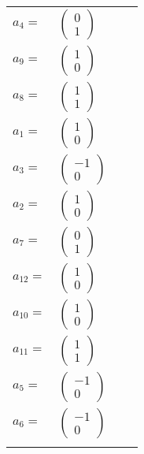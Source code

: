 \documentclass[1p]{elsarticle_modified}
\theoremstyle{definition}
\begin{document}
\begin{tabular}{m{7pt} m{180pt} m{7pt} m{180pt} }
\flushright $a_{4}=$&$\begin{pmatrix}0\\1\end{pmatrix}$ \\
\flushright $a_{9}=$&$\begin{pmatrix}1\\0\end{pmatrix}$ \\
\flushright $a_{8}=$&$\begin{pmatrix}1\\1\end{pmatrix}$ \\
\flushright $a_{1}=$&$\begin{pmatrix}1\\0\end{pmatrix}$ \\
\flushright $a_{3}=$&$\begin{pmatrix}-1\\0\end{pmatrix}$ \\
\flushright $a_{2}=$&$\begin{pmatrix}1\\0\end{pmatrix}$ \\
\flushright $a_{7}=$&$\begin{pmatrix}0\\1\end{pmatrix}$ \\
\flushright $a_{12}=$&$\begin{pmatrix}1\\0\end{pmatrix}$ \\
\flushright $a_{10}=$&$\begin{pmatrix}1\\0\end{pmatrix}$ \\
\flushright $a_{11}=$&$\begin{pmatrix}1\\1\end{pmatrix}$ \\
\flushright $a_{5}=$&$\begin{pmatrix}-1\\0\end{pmatrix}$ \\
\flushright $a_{6}=$&$\begin{pmatrix}-1\\0\end{pmatrix}$\\&\end{tabular}
\end{document}

